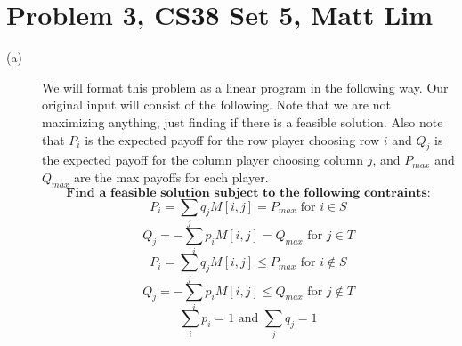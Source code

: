 \documentclass{article}
\begin{document}
\section*{Problem 3, CS38 Set 5, Matt Lim}
\begin{description}
    \item[(a)]
        We will format this problem as a linear program in
        the following way. Our original input will consist of the following.
        Note that we are not maximizing anything, just finding if there is a
        feasible solution. Also note that $P_i$ is the expected payoff for the row player
        choosing row $i$ and $Q_j$ is the expected payoff for the column player
        choosing column $j$, and $P_{max}$ and $Q_{max}$ are the max payoffs
        for each player.
        \[ \textbf{Find a feasible solution subject to the following
        contraints:} \]
        \[ P_i = \sum_{j} q_j M[i,j] = P_{max} \text{ for $i \in S$} \]
        \[ Q_j = -\sum_{i} p_i M[i,j] = Q_{max} \text{ for $j \in T$} \]
        \[ P_i = \sum_{j} q_j M[i,j] \leq P_{max} \text{ for $i \notin S$} \]
        \[ Q_j = -\sum_{i} p_i M[i,j] \leq Q_{max} \text{ for $j \notin T$} \]
        \[ \sum_i p_i = 1 \text{ and } \sum_j q_j = 1 \]


\end{description}
\end{document}
